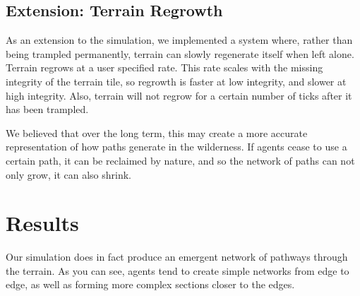 \documentclass[conference]{IEEEtran}
\begin{document}
\subsection{Extension: Terrain Regrowth}
As an extension to the simulation, we implemented a system where, rather than being trampled permanently, terrain can slowly regenerate itself when left alone. Terrain regrows at a user specified rate. This rate scales with the missing integrity of the terrain tile, so regrowth is faster at low integrity, and slower at high integrity. Also, terrain will not regrow for a certain number of ticks after it has been trampled.

We believed that over the long term, this may create a more accurate representation of how paths generate in the wilderness. If agents cease to use a certain path, it can be reclaimed by nature, and so the network of paths can not only grow, it can also shrink.

\section{Results}
Our simulation does in fact produce an emergent network of pathways through the terrain. As you can see, agents tend to create simple networks from edge to edge, as well as forming more complex sections closer to the edges.
\end{document}
